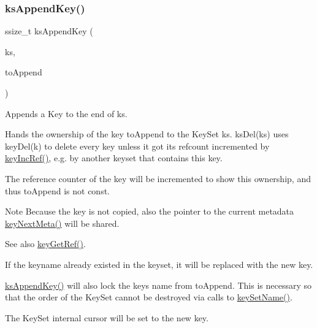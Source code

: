\subsubsection{\texorpdfstring{ks\+Append\+Key()}{ksAppendKey()}}
{\footnotesize\ttfamily ssize\+\_\+t ks\+Append\+Key (\begin{DoxyParamCaption}\item[{Key\+Set $\ast$}]{ks,  }\item[{Key $\ast$}]{to\+Append }\end{DoxyParamCaption})}



Appends a Key to the end of {\ttfamily ks}. 

Hands the ownership of the key {\ttfamily to\+Append} to the Key\+Set {\ttfamily ks}. ks\+Del(ks) uses key\+Del(k) to delete every key unless it got its refcount incremented by \hyperlink{group__key_ga6970a6f254d67af7e39f8e469bb162f1}{key\+Inc\+Ref()}, e.\+g. by another keyset that contains this key.

The reference counter of the key will be incremented to show this ownership, and thus {\ttfamily to\+Append} is not const.

\begin{DoxyNote}{Note}
Because the key is not copied, also the pointer to the current metadata \hyperlink{group__keymeta_ga4c88342f580a4291455a801af71ce048}{key\+Next\+Meta()} will be shared.
\end{DoxyNote}
\begin{DoxySeeAlso}{See also}
\hyperlink{group__key_ga4aabc4272506dd63161db2bbb42de8ae}{key\+Get\+Ref()}.
\end{DoxySeeAlso}
If the keyname already existed in the keyset, it will be replaced with the new key.

\hyperlink{group__keyset_gaa5a1d467a4d71041edce68ea7748ce45}{ks\+Append\+Key()} will also lock the key\textquotesingle{}s name from {\ttfamily to\+Append}. This is necessary so that the order of the Key\+Set cannot be destroyed via calls to \hyperlink{group__keyname_ga7699091610e7f3f43d2949514a4b35d9}{key\+Set\+Name()}.

The Key\+Set internal cursor will be set to the new key.

